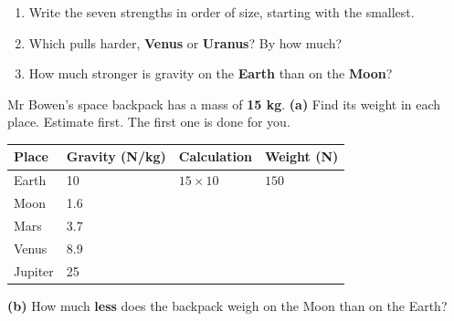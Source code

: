 \documentclass[12pt,a4paper]{article}
\newif\iffr
\newcommand{\fr}[1]{\unskip\iffr\par\vspace{1pt}\noindent{\small\itshape\color{black!60}#1}\par\fi}
\newcommand{\ansline}[1][4.4cm]{\par\vspace{2pt}\hspace*{\fill}\blank[#1]\par}
\newcommand{\tall}{\rule[-0.6em]{0pt}{1.9em}}
\renewcommand{\tall}{\rule[-0.8em]{0pt}{2.4em}}
\begin{document}
\vspace{4pt}
\begin{enumerate}[label=(\alph*), itemsep=8pt]
  \item Write the seven strengths in order of size, starting with the smallest.
        \fr{Range les sept valeurs dans l'ordre croissant.}
        \ansline[11.0cm]
  \item Which pulls harder, \textbf{Venus} or \textbf{Uranus}? By how much?
        \hfill \blank[5.4cm]
        \fr{Laquelle attire le plus fort~: V\'enus ou Uranus~? De combien~?}
  \item How much stronger is gravity on the \textbf{Earth} than on the
        \textbf{Moon}? \hfill \blank[4.0cm]
        \fr{De combien la gravit\'e est-elle plus forte sur la Terre que sur la Lune~?}
\end{enumerate}


\noindent Mr Bowen's space backpack has a mass of \textbf{15 kg}. \textbf{(a)} Find its weight in
each place. Estimate first. The first one is done for you.
\fr{Le sac \`a dos spatial de Mr Bowen a une masse de 15 kg. (a) Calcule son poids
(\eng{weight}) sur chaque astre, en commen\c{c}ant par une estimation. La premi\`ere
ligne est faite pour toi.}

\vspace{4pt}
\noindent
\begin{tabularx}{\textwidth}{|C{2.4cm}|C{3.0cm}|L|C{2.8cm}|}
  \hline
  \textbf{Place} & \textbf{Gravity (N/kg)} & \textbf{Calculation} &
  \textbf{Weight (N)} \\
  \hline
  Earth \tall   & 10  & $15 \times 10$ & $150$ \\ \hline
  Moon \tall    & 1.6 & & \\ \hline
  Mars \tall    & 3.7 & & \\ \hline
  Venus \tall   & 8.9 & & \\ \hline
  Jupiter \tall & 25  & & \\ \hline
\end{tabularx}

\vspace{6pt}
\noindent \textbf{(b)} How much \textbf{less} does the backpack weigh on the Moon than
on the Earth? \hfill \blank[2.6cm]
\fr{(b) Sur la Lune, combien le sac p\`ese-t-il de moins (\eng{less}) que sur la
Terre~?}

\end{document}
